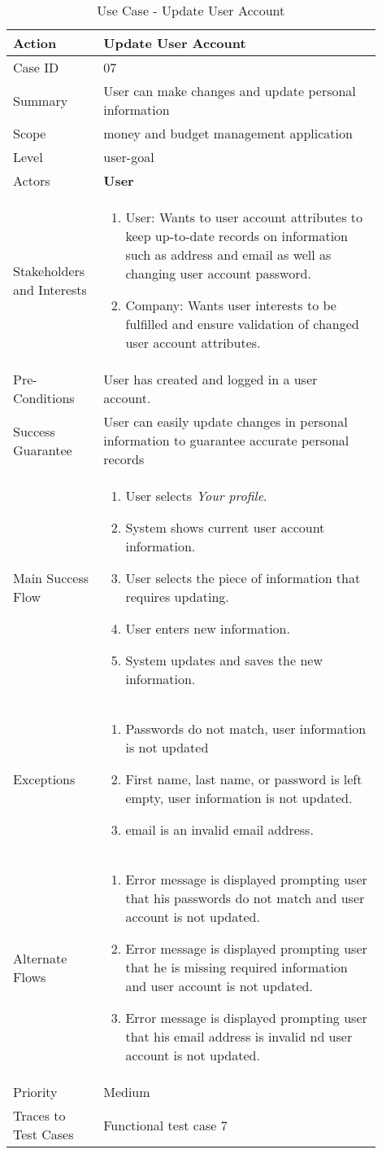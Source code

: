 \documentclass[11pt]{article}
\newcounter{use case ID}
\newcommand\tabularhead[1]{
    \begin{table}[ht]
        \addtocounter{use case ID}{1}
        \caption{Use Case \arabic{use case ID} - #1}
        \vspace{0.2cm}
        \begin{tabular}{|p{0.2\linewidth}|p{0.70\linewidth}|}
            \hline
            \textbf{Action} & \textbf{#1} \\
            \hline}
\newcommand\addrow[2]{#1 & #2\\ \hline}
\newcommand\addmulrow[2]{ \begin{minipage}[t][][t]{2.5cm}#1\end{minipage}
                &\begin{minipage}[t][][t]{11cm}
                    \begin{enumerate}[itemsep=-1ex] #2   \end{enumerate}
                \end{minipage}\vfill\\ \hline}
\newenvironment{usecase}{\tabularhead}
        {\hline\end{tabular}\end{table}}
\newcounter{req ID}
\begin{document}
\begin{usecase}{Update User Account}
    \addrow{Case ID}{07}
    \addrow{Summary}{User can make changes and update personal information}
    \addrow{Scope}{money and budget management application}
    \addrow{Level}{user-goal}
    \addrow{Actors}{\textbf{User}}
    \addmulrow{Stakeholders and Interests}{
    \item User:  Wants to user account attributes to keep up-to-date records on information such as address and email as well as changing user account password.
    \item Company: Wants user interests to be fulfilled and ensure validation of changed user account attributes. }
    \addrow{Pre-Conditions}{User has created and logged in a user account.}
    \addrow{Success Guarantee}{User can easily update changes in personal information to guarantee accurate personal records }
    \addmulrow{Main Success Flow}{
    \item User selects \textit{Your profile}.
    \item System shows current user account information.
    \item User selects the piece of information that requires updating.
    \item User enters new information.
    \item System updates and saves the new information.
    }
    \addmulrow{Exceptions}{
    \item Passwords do not match, user information is not updated
    \item First name, last name, or password is left empty, user information is not updated.
    \item email is an invalid email address.
    }
    \addmulrow{Alternate Flows}{
    \item Error message is displayed prompting user that his passwords do not match and user account is not updated.
    \item Error message is displayed prompting user that he is missing required information and user account is not updated.
    \item Error message is displayed prompting user that his email address is invalid nd user account is not updated.
    }
    \addrow{Priority}{Medium}
    \addrow{Traces to Test Cases}{Functional test case 7}
\end{usecase}
\end{document}
